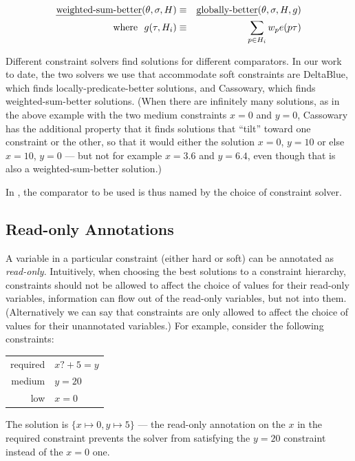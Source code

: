 \begin{eqnarray*}
\mbox{\em weighted-sum-better\/}(\theta,\sigma,H)  & \equiv &
  \mbox{\em globally-better\/}(\theta,\sigma,H,g)  \\
  \mbox{\rm where\ \ } g(\tau,H_i) & \equiv & 
	\sum_{p \in H_i} w_p e(p \tau) \\
\end{eqnarray*}

Different constraint solvers find solutions for different comparators.
In our work to date, the two solvers we use that accommodate soft
constraints are DeltaBlue, which finds locally-predicate-better
solutions, and Cassowary, which finds weighted-sum-better solutions.
(When there are infinitely many solutions, as in the above example
with the two medium constraints $x=0$ and $y=0$, Cassowary has the
additional property that it finds solutions that ``tilt'' toward one
constraint or the other, so that it would \DIFaddbegin {}\DIFaddend either the solution
$x=0$, $y=10$ or else $x=10$, $y=0$ --- but not for example $x=3.6$
and $y=6.4$, even though that is also a weighted-sum-better solution.)

In \langname, the comparator to be used is thus named by the choice of
constraint solver.

\subsection{Read-only Annotations}

A variable in a particular constraint (either hard or soft) can be
annotated as \emph{read-only}.  Intuitively, when choosing the best
solutions to a constraint hierarchy, constraints should not be allowed
to affect the choice of values for their read-only variables, \ie
information can flow out of the read-only variables, but not into
them.  (Alternatively we can say that constraints are only allowed to
affect the choice of values for their unannotated variables.)  For
example, consider the following constraints:
\begin{center}
\begin{tabular}{rl}
required &     $x?+5=y$ \\
medium   &     $y=20$ \\
low      &     $x=0$
\end{tabular}
\end{center}

The solution is $\{x \mapsto 0, y \mapsto 5\}$ --- the read-only
annotation on the $x$ in the required constraint prevents the solver
from satisfying the $y=20$ constraint instead of the $x=0$ one.

